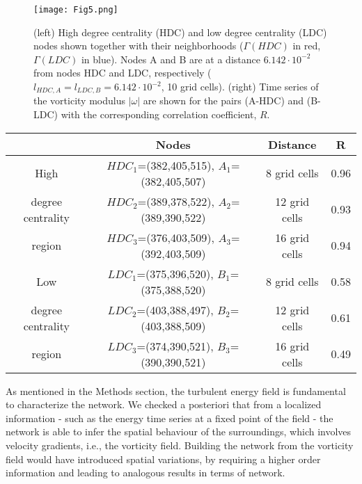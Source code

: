\documentclass{ws-ijbc}
\begin{document}
\begin{figure}[h]
\texttt{[image: Fig5.png]}
\caption{(left) High degree centrality (HDC) and low degree centrality (LDC) nodes shown together with their neighborhoods ($\Gamma(HDC)$ in red, $\Gamma(LDC)$ in blue). Nodes A and B are at a distance $6.142 \cdot 10^{-2}$ from nodes HDC and LDC, respectively ($l_{HDC,A}=l_{LDC,B}=6.142 \cdot 10^{-2}$, 10 grid cells). (right) Time series of the vorticity modulus $|\omega|$ are shown for the pairs (A-HDC) and (B-LDC) with the corresponding correlation coefficient, $R$.}
\label{discussion}
\end{figure}

\begin{table}[h]
{\begin{tabular}{|c|c|c|c|}
  \hline
  & Nodes & Distance & R \\
  \hline
  High & $HDC_1$=(382,405,515), $A_1$=(382,405,507) & 8 grid cells & 0.96 \\
  \cline{2-4}
  degree centrality & $HDC_2$=(389,378,522), $A_2$=(389,390,522) & 12 grid cells  & 0.93 \\
  \cline{2-4}
  region & $HDC_3$=(376,403,509), $A_3$=(392,403,509) & 16 grid cells  & 0.94 \\
  \hline
  Low & $LDC_1$=(375,396,520), $B_1$=(375,388,520) & 8 grid cells  & 0.58 \\
  \cline{2-4}
  degree centrality & $LDC_2$=(403,388,497), $B_2$=(403,388,509) & 12 grid cells  & 0.61 \\
  \cline{2-4}
  region & $LDC_3$=(374,390,521), $B_3$=(390,390,521) & 16 grid cells  & 0.49 \\
  \hline
\end{tabular}}
\end{table}

As mentioned in the Methods section, the turbulent energy field is fundamental to characterize the network. We checked a posteriori that from a localized information - such as the energy time series at a fixed point of the field - the network is able to infer the spatial behaviour of the surroundings, which involves velocity gradients, i.e., the vorticity field. Building the network from the vorticity field would have introduced spatial variations, by requiring a higher order information and leading to analogous results in terms of network.
\end{document}
